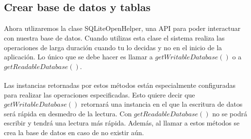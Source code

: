\documentclass[10pt]{extarticle}
\begin{document}
\subsection{Crear base de datos y tablas}

\paragraph{}
Ahora utlizaremos la clase SQLiteOpenHelper, una API para poder interactuar con nuestra base de datos. Cuando utilizas esta clase el sistema realiza las operaciones de larga duración cuando tu lo decidas y no en el inicio de la aplicación. Lo único que se debe hacer es llamar a $getWritableDatabase()$ o a $getReadableDatabase()$. 
\paragraph{}
Las instancias retornadas por estos métodos están especialmente configuradas para realizar las operaciones especificadas. Esto quiere decir que $getWritableDatabase()$ retornará una instancia en el que la escritura de datos será rápida en desmedro de la lectura. Con $getReadableDatabase()$ no se podrá escribir y tendrá una lectura más rápida. Además, al llamar a estos métodos se crea la base de datos en caso de no existir aún.
\end{document}
